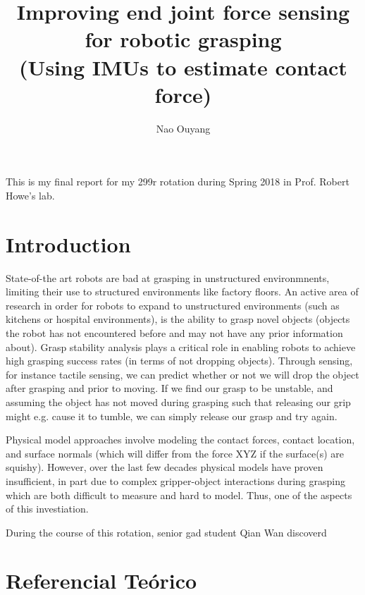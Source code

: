 \documentclass[12pt]{article}
\title{Improving end joint force sensing for robotic grasping\\
(Using IMUs to estimate contact force)}
\author{Nao Ouyang}
\begin{document}
 

\maketitle

\begin{introduction}
    This is my final report for my 299r rotation during Spring 2018 in Prof. Robert Howe's lab.
\end{introduction}
    

\section{Introduction}

State-of-the art robots are bad at grasping in unstructured environmnents, limiting their use to
structured environments like factory floors. An active area of research in order for robots to expand to unstructured
environments (such as kitchens or hospital environments),  is the ability to grasp
novel objects (objects the robot has not encountered before and may not have any prior information
about). Grasp stability analysis plays a critical role in enabling robots to achieve high grasping
success rates (in terms of not dropping objects). Through sensing, for instance tactile sensing, we
can predict whether or not we will drop the object after grasping and prior to moving. If we find
our grasp to be unstable, and assuming the object has not moved during grasping such that releasing
our grip might e.g. cause it to tumble, we can simply release our grasp and try again. 

Physical model approaches involve modeling the contact forces, contact location, and surface normals
(which will differ from the force XYZ if the surface(s) are squishy). However, over the last few
decades physical models have proven insufficient, in part due to complex gripper-object interactions
during grasping which are both difficult to measure and hard to model. Thus, one of the aspects of
this investiation.

During the course of this rotation, senior gad student Qian Wan discoverd 

\section{Referencial Teórico} \label{sec:firstpage}
\end{document}
